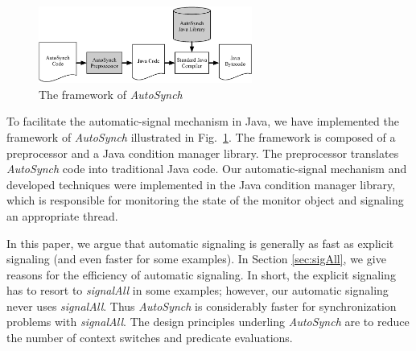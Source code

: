 \documentclass[preprint]{sigplanconf}
\begin{document}
\begin{figure}[ht!]
  \centering
  \includegraphics[width=70mm]{fig/flow.eps}
  \caption{The framework of {\em  AutoSynch}}
  \label{fig:fw}
\end{figure}


To facilitate the automatic-signal mechanism in Java, we have implemented the 
framework of {\em AutoSynch} illustrated in Fig.~\ref{fig:fw}. 
The framework is composed of a 
preprocessor and a Java condition manager library. The preprocessor translates 
{\em AutoSynch} code into traditional Java code. 
Our automatic-signal mechanism and 
developed techniques were implemented in the Java condition manager library, 
which is responsible for monitoring the state of the monitor object
and signaling an appropriate thread.


%


In this paper, we argue that automatic signaling is generally as fast as explicit 
signaling (and even faster for some examples). In Section \ref{sec:sigAll}, we give reasons
for the efficiency of automatic signaling. In short, the explicit signaling has 
to resort to {\em signalAll} in some examples; however, our automatic signaling never 
uses {\em signalAll}. Thus {\em AutoSynch} is 
considerably faster for synchronization problems with 
{\em signalAll}. The design principles underling {\em AutoSynch} are to reduce 
the number of context switches and predicate evaluations.
\end{document}
